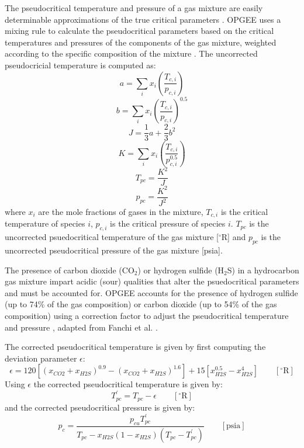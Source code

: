 \documentclass[11pt]{report}
\newcommand{\eqnunit}[1]{\quad\quad \scriptstyle{\left[\text{#1}\right]}}
\begin{document}
The pseudocritical temperature and pressure of a gas mixture are easily determinable approximations of the true critical parameters \cite[p. 111]{Mccain1990}. OPGEE uses a mixing rule to calculate the pseudocritical parameters based on the critical temperatures and pressures of the components of the gas mixture, weighted according to the specific composition of the mixture \cite{StewartBurkhardtVoo1959}. The uncorrected pseudocricial temperature is computed as:
\begin{equation}
a = \sum_i x_i \left( \frac{T_{c,i}}{p_{c,i}} \right)
\end{equation}
\begin{equation}
b = \sum_i x_i \left(\frac{T_{c,i}}{p_{c,i}} \right)^{0.5}
\end{equation}
\begin{equation}
J = \frac{1}{3}a + \frac{2}{3}b^2
\end{equation}
\begin{equation}
K = \sum_i x_i \left( \frac{T_{c,i}}{p_{c,i}^{0.5}}  \right)
\end{equation}
\begin{equation}\label{eq:Tpc}
T_{pc} = \frac{K^2}{J}
\end{equation}
\begin{equation}\label{eq:Ppc}
p_{pc} = \frac{K^2}{J^2}
\end{equation}
where $x_i$ are the mole fractions of gases in the mixture, $T_{c,i}$ is the critical temperature of species $i$, $p_{c,i}$ is the critical pressure of species $i$.  $T_{pc}$ is the uncorrected psuedocritical temperature of the gas mixture [$^\circ$R] and $p_{pc}$ is the uncorrected pseudocritical pressure of the gas mixture [psia].

The presence of carbon dioxide (CO$_2$) or hydrogen sulfide (H$_2$S) in a hydrocarbon gas mixture impart acidic (sour) qualities that alter the psuedocritical parameters and must be accounted for. OPGEE accounts for the presence of hydrogen sulfide (up to 74\% of the gas composition) or carbon dioxide (up to 54\% of the gas composition) using a correction factor to adjust the pseudocritical temperature and pressure \cite{WichertAziz1972}, adapted from Fanchi et al. \cite[p. 229]{Fanchi2007}. 

The corrected pseudocritical temperature is given by first computing the deviation parameter $\epsilon$:
\begin{equation}
\epsilon =  120\left[(x_{CO2} + x_{H2S})^{0.9} - (x_{CO2} + x_{H2S})^{1.6}\right] + 15 \left[ x_{H2S}^{0.5} - x_{H2S}^4 \right] \eqnunit{$^\circ$R}
\end{equation}
Using $\epsilon$ the corrected pseudocritical temperature is given by:
\begin{equation}
T_{pc}^{'} = T_{pc} - \epsilon \eqnunit{$^\circ$R}
\end{equation}
and the corrected pseudocritical pressure is given by:
\begin{equation}
p_c = \frac{ p_{cu}T_{pc}^{'}}{T_{pc} - x_{H2S}(1-x_{H2S})(T_{pc}-T_{pc}^{'})}  \eqnunit{psia}
\end{equation}
\end{document}
